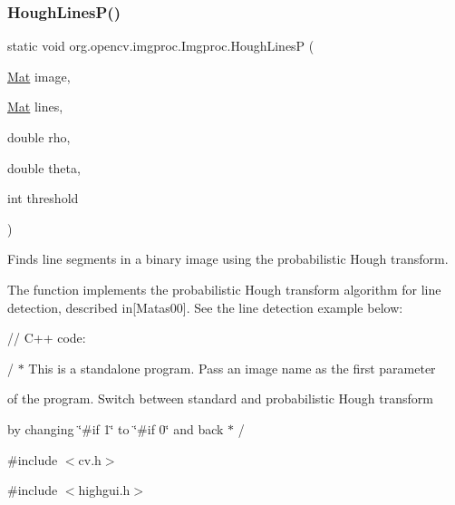\subsubsection{\texorpdfstring{Hough\+Lines\+P()}{HoughLinesP()}\hspace{0.1cm}{\footnotesize\ttfamily [2/2]}}
{\footnotesize\ttfamily static void org.\+opencv.\+imgproc.\+Imgproc.\+Hough\+LinesP (\begin{DoxyParamCaption}\item[{\mbox{\hyperlink{classorg_1_1opencv_1_1core_1_1_mat}{Mat}}}]{image,  }\item[{\mbox{\hyperlink{classorg_1_1opencv_1_1core_1_1_mat}{Mat}}}]{lines,  }\item[{double}]{rho,  }\item[{double}]{theta,  }\item[{int}]{threshold }\end{DoxyParamCaption})\hspace{0.3cm}{\ttfamily [static]}}

Finds line segments in a binary image using the probabilistic Hough transform.

The function implements the probabilistic Hough transform algorithm for line detection, described in\mbox{[}Matas00\mbox{]}. See the line detection example below\+: {\ttfamily }

{\ttfamily }

{\ttfamily }

{\ttfamily // C++ code\+:}

{\ttfamily }

{\ttfamily }

{\ttfamily / $\ast$ This is a standalone program. Pass an image name as the first parameter}

{\ttfamily }

{\ttfamily }

{\ttfamily of the program. Switch between standard and probabilistic Hough transform}

{\ttfamily }

{\ttfamily }

{\ttfamily by changing \char`\"{}\#if 1\char`\"{} to \char`\"{}\#if 0\char`\"{} and back $\ast$ /}

{\ttfamily }

{\ttfamily }

{\ttfamily \#include $<$cv.\+h$>$}

{\ttfamily }

{\ttfamily }

{\ttfamily \#include $<$highgui.\+h$>$}

